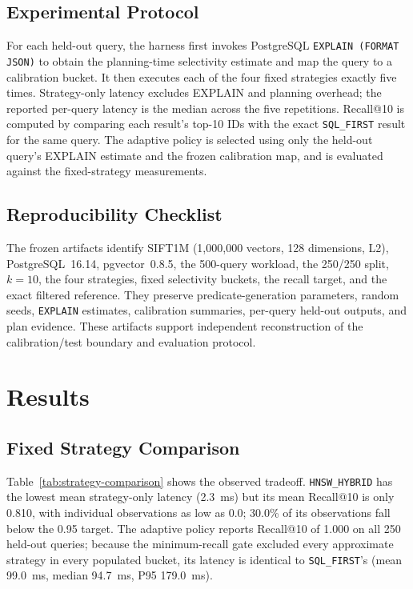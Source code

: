 \documentclass[conference]{IEEEtran}
\begin{document}
\subsection{Experimental Protocol}
For each held-out query, the harness first invokes PostgreSQL \texttt{EXPLAIN (FORMAT JSON)} to obtain the planning-time selectivity estimate and map the query to a calibration bucket. It then executes each of the four fixed strategies exactly five times. Strategy-only latency excludes EXPLAIN and planning overhead; the reported per-query latency is the median across the five repetitions. Recall@10 is computed by comparing each result's top-10 IDs with the exact \texttt{SQL\_FIRST} result for the same query. The adaptive policy is selected using only the held-out query's EXPLAIN estimate and the frozen calibration map, and is evaluated against the fixed-strategy measurements.

\subsection{Reproducibility Checklist}
The frozen artifacts identify SIFT1M (1,000,000 vectors, 128 dimensions, L2), PostgreSQL~16.14, pgvector~0.8.5, the 500-query workload, the 250/250 split, $k=10$, the four strategies, fixed selectivity buckets, the recall target, and the exact filtered reference. They preserve predicate-generation parameters, random seeds, \texttt{EXPLAIN} estimates, calibration summaries, per-query held-out outputs, and plan evidence. These artifacts support independent reconstruction of the calibration/test boundary and evaluation protocol.

\section{Results}
\subsection{Fixed Strategy Comparison}
Table~\ref{tab:strategy-comparison} shows the observed tradeoff. \texttt{HNSW\_HYBRID} has the lowest mean strategy-only latency (2.3~ms) but its mean Recall@10 is only 0.810, with individual observations as low as 0.0; 30.0\% of its observations fall below the 0.95 target. The adaptive policy reports Recall@10 of 1.000 on all 250 held-out queries; because the minimum-recall gate excluded every approximate strategy in every populated bucket, its latency is identical to \texttt{SQL\_FIRST}'s (mean 99.0~ms, median 94.7~ms, P95 179.0~ms).

\end{document}
